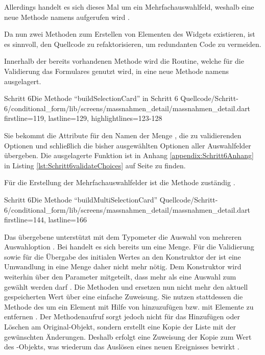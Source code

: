 Allerdings handelt es sich dieses Mal um ein Mehrfachauswahlfeld,
weshalb eine neue Methode namens  aufgerufen wird .

Da nun zwei Methoden zum Erstellen von Elementen des Widgets  existieren,
ist es sinnvoll,
den Quellcode zu refaktorisieren,
um redundanten Code zu vermeiden.



Innerhalb der bereits vorhandenen Methode  wird die Routine,
welche für die Validierung das Formulares genutzt wird,
in eine neue Methode namens   ausgelagert.
\begin{alexlisting}{Schritt 6}{Die Methode \enquote{buildSelectionCard} in Schritt 6}
  {Quellcode/Schritt-6/conditional_form/lib/screens/massnahmen_detail/massnahmen_detail.dart}
  {firstline=119, lastline=129, highlightlines={123-128}}
  \label{lst:Schritt6buildSelectionCard}
\end{alexlisting}

Sie bekommt die Attribute für den Namen der Menge ,
die zu validierenden Optionen 
und schließlich die bisher ausgewählten Optionen aller Auswahlfelder  übergeben.
Die ausgelagerte Funktion ist in Anhang \ref{appendix:Schritt6Anhang} in Listing \ref{lst:Schritt6validateChoices} auf Seite \pageref{lst:Schritt6validateChoices} zu finden.


Für die Erstellung der Mehrfachauswahlfelder ist die Methode  zuständig \Lst{\ref{lst:Schritt6buildMultiSelectionCard}}.

\begin{alexlisting}{Schritt 6}{Die Methode \enquote{buildMultiSelectionCard}}
  {Quellcode/Schritt-6/conditional_form/lib/screens/massnahmen_detail/massnahmen_detail.dart}
  {firstline=144, lastline=166}
  \label{lst:Schritt6buildMultiSelectionCard}
\end{alexlisting}

Das übergebene  unterstützt mit dem Typometer  die Auswahl von mehreren Auswahloption .
Bei  handelt es sich bereits um eine Menge. Für die Validierung  sowie für die Übergabe des initialen Wertes an den Konstruktor der   ist eine Umwandlung in eine Menge daher nicht mehr nötig.
Dem Konstruktor  wird weiterhin über den Parameter  mitgeteilt, dass mehr als eine Auswahl zum gewählt werden darf .
Die Methoden  und  ersetzen nun nicht mehr den aktuell gespeicherten Wert über eine einfache Zuweisung.
Sie nutzen stattdessen die Methode  des  um ein Element mit Hilfe von  hinzuzufügen  bzw. mit  Elemente zu entfernen .
Der Methodenaufruf  sorgt jedoch nicht für das Hinzufügen oder Löschen am Original-Objekt, sondern erstellt eine Kopie der Liste mit der gewünschten Änderungen.
Deshalb erfolgt eine Zuweisung der Kopie zum Wert des -Objekts, was wiederum das Auslösen eines neuen Ereignisses bewirkt .

